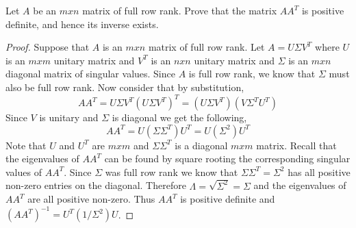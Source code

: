 \documentclass[12pt]{article}
\makeatletter
\theoremstyle{homework}
\newenvironment{exercise}[1]
{\def\@currentlabel{#1}\exercisecore}
{\endexercisecore}
\makeatother
\begin{document}
\begin{exercise}{3.4} Let $A$ be an $mxn$ matrix of full row rank. Prove that the matrix $AA^T$
  is positive definite, and hence its inverse exists. \\
  \begin{proof} Suppose that $A$ is an $mxn$ matrix of full row rank. Let $A = U\Sigma V^T$ where 
    $U$ is an $mxm$ unitary matrix and $V^T$ is an $nxn$ unitary matrix and $\Sigma$ is an $m x n$
    diagonal matrix of singular values. Since $A$ is full row rank, we know that $\Sigma$ must also be full 
    row rank. Now consider that by substitution, 
    \begin{equation*}
      AA^T = U\Sigma V^T(U\Sigma V^T)^T = (U\Sigma V^T) (V\Sigma^T U^T)
    \end{equation*}
    Since $V$ is unitary and $\Sigma$ is diagonal we get the following, 
    \begin{equation*}
      AA^T = U(\Sigma\Sigma^T)U^T = U(\Sigma^2)U^T
    \end{equation*}
    Note that $U$ and $U^T$ are $m x m$ and $\Sigma\Sigma^T$ is a diagonal $m x m$ matrix. Recall that the eigenvalues 
    of $AA^T$ can be found by square rooting the corresponding singular values of $AA^T$. Since $\Sigma$ was full row 
    rank we know that $\Sigma\Sigma^T = \Sigma^2$ has all positive non-zero entries on the diagonal. 
    Therefore $\Lambda = \sqrt{\Sigma^2} = \Sigma$ and the eigenvalues of $AA^T$ are all positive non-zero. Thus $AA^T$ is 
    positive definite and $(AA^T)^{-1} =  U^T(1/\Sigma^2)U$. 
  \end{proof}
\end{exercise}
\vspace{.5in}
\end{document}
